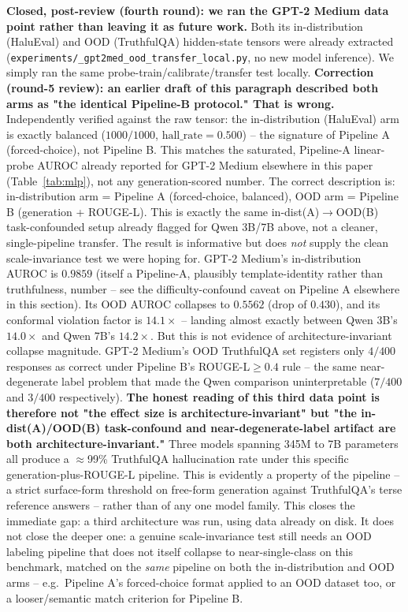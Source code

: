 \documentclass[10pt,twocolumn]{article}
\begin{document}
\textbf{Closed, post-review (fourth round): we ran the GPT-2 Medium
data point rather than leaving it as future work.} Both its
in-distribution (HaluEval) and OOD (TruthfulQA) hidden-state tensors
were already extracted
(\texttt{experiments/\_\allowbreak gpt2med\_\allowbreak ood\_\allowbreak transfer\_\allowbreak local.py}, no
new model inference). We simply ran the same
probe-train/calibrate/transfer test locally. \textbf{Correction
(round-5 review): an earlier draft of this paragraph described both
arms as "the identical Pipeline-B protocol." That is wrong.}
Independently verified against the raw tensor: the in-distribution
(HaluEval) arm is exactly balanced ($1000/1000$,
$\text{hall\_rate}=0.500$) -- the signature of Pipeline A
(forced-choice), not Pipeline B. This matches the saturated,
Pipeline-A linear-probe AUROC already reported for GPT-2 Medium
elsewhere in this paper (Table~\ref{tab:mlp}), not any
generation-scored number. The correct description is: in-distribution
arm = Pipeline A (forced-choice, balanced), OOD arm = Pipeline B
(generation + ROUGE-L). This is exactly the same
in-dist(A)$\to$OOD(B) task-confounded setup already flagged for Qwen
3B/7B above, not a cleaner, single-pipeline transfer. The result is
informative but does \emph{not} supply the clean scale-invariance test
we were hoping for. GPT-2 Medium's in-distribution AUROC is $0.9859$
(itself a Pipeline-A, plausibly template-identity rather than
truthfulness, number -- see the difficulty-confound caveat on Pipeline
A elsewhere in this section). Its OOD AUROC collapses to $0.5562$
(drop of $0.430$), and its conformal violation factor is $14.1\times$
-- landing almost exactly between Qwen 3B's $14.0\times$ and Qwen 7B's
$14.2\times$. But this is not evidence of architecture-invariant
collapse magnitude. GPT-2 Medium's OOD TruthfulQA set registers only
$4/400$ responses as correct under Pipeline B's ROUGE-L$\geq 0.4$ rule
-- the same near-degenerate label problem that made the Qwen
comparison uninterpretable ($7/400$ and $3/400$ respectively).
\textbf{The honest reading of this third data point is therefore not
"the effect size is architecture-invariant" but "the in-dist(A)/OOD(B)
task-confound and near-degenerate-label artifact are both
architecture-invariant."} Three models spanning 345M to 7B parameters
all produce a $\approx$99\% TruthfulQA hallucination rate under this
specific generation-plus-ROUGE-L pipeline. This is evidently a property
of the pipeline -- a strict surface-form threshold on free-form
generation against TruthfulQA's terse reference answers -- rather than
of any one model family. This closes the immediate gap: a third
architecture was run, using data already on disk. It does not close the
deeper one: a
genuine scale-invariance test still needs an OOD labeling pipeline that
does not itself collapse to near-single-class on this benchmark,
matched on the \emph{same} pipeline on both the in-distribution and OOD
arms -- e.g.\ Pipeline A's forced-choice format applied to an OOD
dataset too, or a looser/semantic match criterion for Pipeline B.
\end{document}
